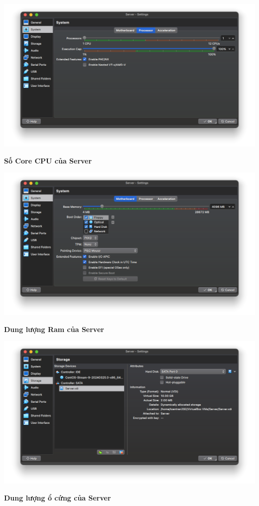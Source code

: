 \begin{minipage}{.93\linewidth}
  \captionsetup{type=figure}
  \includegraphics[width=\linewidth]{./imgs/Hinh-4.png}
  \caption{\bfseries Số Core CPU của Server}
  \label{fig:server-processor}
\end{minipage}



\begin{minipage}{.93\linewidth}
  \captionsetup{type=figure}
  \includegraphics[width=\linewidth]{./imgs/Hinh-3.png}
  \caption{\bfseries Dung lượng Ram của Server}
  \label{fig:server-ram}
\end{minipage}


\begin{minipage}{.93\linewidth}
  \captionsetup{type=figure}
  \includegraphics[width=\linewidth]{./imgs/Hinh-5.png}
  \caption{\bfseries Dung lượng ổ cứng của Server}
  \label{fig:server-disk}
\end{minipage}


